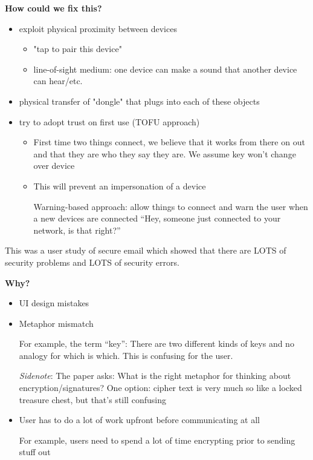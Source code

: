 \textbf{How could we fix this?}
\begin{itemize}
	\item exploit physical proximity between devices
		\begin{itemize}
			\item "tap to pair this device"
			\item line-of-sight medium: one device can make a sound that another device can hear/etc.
		\end{itemize}
	\item physical transfer of "dongle" that plugs into each of these objects
	\item try to adopt trust on first use (TOFU approach)
		\begin{itemize}
			\item First time two things connect, we believe that it works from there on out and that they are who they say they are. We assume key won't change over device
			\item This will prevent an impersonation of a device

				Warning-based approach: allow things to connect and warn the user when a new devices are connected ``Hey, someone just connected to your network, is that right?''
		\end{itemize}
\end{itemize}


This was a user study of secure email which showed that there are LOTS of security problems and LOTS of security errors.

\textbf{Why?}
\begin{itemize}
	\item UI design mistakes
	\item Metaphor mismatch

		For example, the term ``key'': There are two different kinds of keys and no analogy for which is which. This is confusing for the user.

		\textit{Sidenote}: The paper asks: What is the right metaphor for thinking about encryption/signatures? One option: cipher text is very much so like a locked treasure chest, but that's still confusing
	\item User has to do a lot of work upfront before communicating at all

		For example, users need to spend a lot of time encrypting prior to sending stuff out
\end{itemize}

